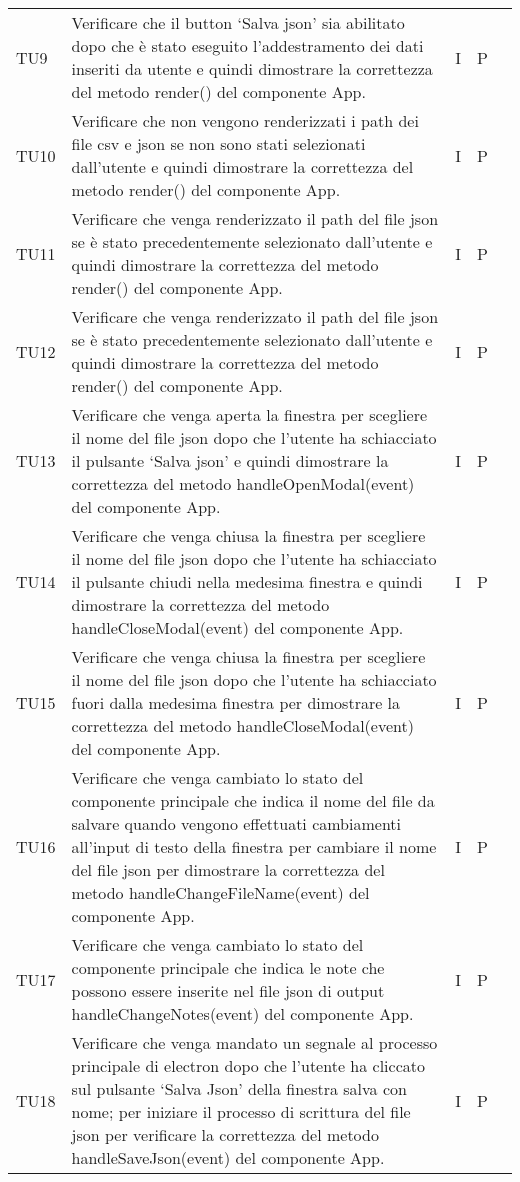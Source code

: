\begin{longtable} {
		>{}p{15mm} 
		>{}p{79.5mm}
		>{}p{15mm} 
		>{}p{15mm}
		>{}p{0mm}}
	TU9	& Verificare che il button ‘Salva json’ sia abilitato dopo che è stato eseguito l’addestramento dei dati inseriti da utente e quindi dimostrare la correttezza del metodo render() del componente App. & I & P &\TBstrut \\ [2mm]
	TU10	& Verificare che non vengono renderizzati i path dei file csv e json se non sono stati selezionati dall’utente e quindi dimostrare la correttezza del metodo render() del componente App. & I & P &\TBstrut \\ [2mm]
	TU11	& Verificare che venga renderizzato il path del file json se è stato precedentemente selezionato dall’utente e quindi dimostrare la correttezza del metodo render() del componente App. & I & P &\TBstrut \\ [2mm]
	TU12	& Verificare che venga renderizzato il path del file json se è stato precedentemente selezionato dall’utente e quindi dimostrare la correttezza del metodo render() del componente App. & I & P &\TBstrut \\ [2mm]
	TU13	& Verificare che venga aperta la finestra per scegliere il nome del file json dopo che l’utente ha schiacciato il pulsante ‘Salva json’ e quindi dimostrare la correttezza del metodo handleOpenModal(event) del componente App. & I & P &\TBstrut \\ [2mm]
	TU14	& Verificare che venga chiusa la finestra per scegliere il nome del file json dopo che l’utente ha schiacciato il pulsante chiudi nella medesima finestra e quindi dimostrare la correttezza del metodo handleCloseModal(event) del componente App. & I & P &\TBstrut \\ [2mm]
	TU15	& Verificare che venga chiusa la finestra per scegliere il nome del file json dopo che l’utente ha schiacciato fuori dalla medesima finestra per dimostrare la correttezza del metodo handleCloseModal(event) del componente App. & I & P &\TBstrut \\ [2mm]
	TU16	& Verificare che venga cambiato lo stato del componente principale che indica il nome del file da salvare quando vengono effettuati cambiamenti all'input di testo della finestra per cambiare il nome del file json per dimostrare la correttezza del metodo handleChangeFileName(event) del componente App. & I & P &\TBstrut \\ [2mm]
	TU17	& Verificare che venga cambiato lo stato del componente principale che indica le note che possono essere inserite nel file json di output handleChangeNotes(event) del componente App. & I & P &\TBstrut \\ [2mm]
	TU18	& Verificare che venga mandato un segnale al processo principale di electron dopo che l’utente ha cliccato sul pulsante ‘Salva Json’ della finestra salva con nome; per iniziare il processo di scrittura del file json per verificare la correttezza del metodo handleSaveJson(event) del componente App. & I & P &\TBstrut \\ [2mm]

\end{longtable}
